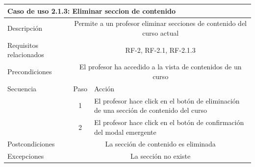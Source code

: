 \hspace{3cm}

\begin{tabular}[H]{l c l}
\toprule 
\multicolumn{3}{l}{\textbf{Caso de uso 2.1.3: Eliminar seccion de contenido}}\\
\midrule
Descripción & \multicolumn{2}{p{10cm}}{Permite a un profesor eliminar secciones de contenido del curso actual }\\
\midrule
Requisitos relacionados & \multicolumn{2}{p{10cm}}{RF-2, RF-2.1, RF-2.1.3}\\
\midrule
Precondiciones & \multicolumn{2}{p{10cm}}{El profesor ha accedido a la vista de contenidos de un curso}\\
\midrule
Secuencia & Paso & Acción \\
\cmidrule{2-3}
         & 1 &  \multicolumn{1}{p{8cm}}{El profesor hace click en el botón de eliminación de una sección de contenido del curso}\\
         & 2 &  \multicolumn{1}{p{8cm}}{El profesor hace click en el botón de confirmación del modal emergente}\\
         
\midrule
Postcondiciones & \multicolumn{2}{p{10cm}}{La sección de contenido es eliminada}\\
\midrule
Excepciones & \multicolumn{2}{p{10cm}}{La sección no existe}\\
\bottomrule 
\end{tabular}

\hspace{3cm}



